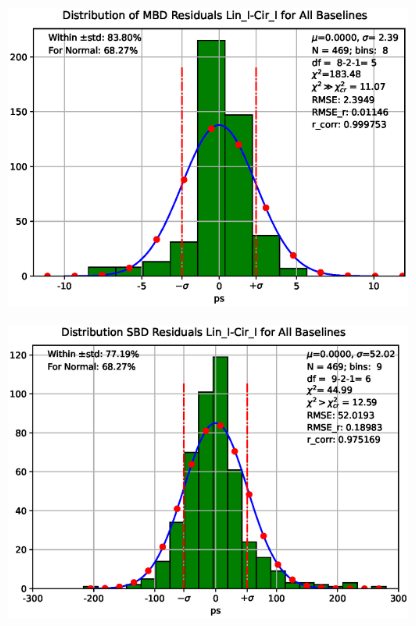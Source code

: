 \documentclass[letterpaper,twoside,12pt]{article}
\begin{document}
\begin{figure}[ht!]
  \begin{center}
  \includegraphics[width=25pc]{Distr_MBD_Lin_I-Cir_I_Diff.eps}
  \caption{\small }
  \label{dmbd_distr}
  \end{center}
\end{figure}


\begin{figure}[ht!]
  \begin{center}
  \includegraphics[width=25pc]{Distr_SBD_Lin_I-Cir_I_Diff.eps}
  \caption{\small }
  \label{dsbd_distr}
  \end{center}
\end{figure}
\end{document}
